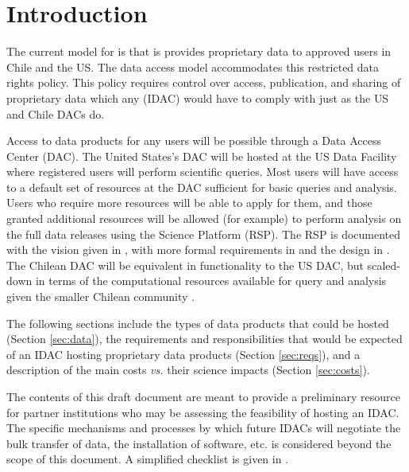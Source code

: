 \section{Introduction}\label{sec:intro}


The current model for \VRO is that is provides proprietary data to approved users in Chile and the \gls{US}. The data access model accommodates this restricted data rights policy. This policy requires control over access, publication, and sharing of proprietary data which any (\gls{IDAC}) would have to comply with just as the \gls{US} and Chile DACs do.

Access to \RO data products for any users will be possible through a Data Access \gls{Center} (\gls{DAC}). The United States's \gls{DAC} will be hosted at the \gls{US} Data Facility
where registered \RO users will perform scientific queries. Most users will have access to a default set of resources at the \gls{DAC} sufficient for basic queries and analysis. Users who require more resources will be able to apply for them, and those granted additional resources will be allowed (for example) to perform analysis on the full data releases using the \RO \gls{Science Platform} (\gls{RSP}). The \gls{RSP} is documented with the vision given in , with more formal requirements in  and the design in . The Chilean \gls{DAC} will be equivalent in functionality to the \gls{US} \gls{DAC}, but scaled-down in terms of the computational resources available for query and analysis given the smaller Chilean community .

The following sections include the types of data products that could be hosted (Section \ref{sec:data}), the requirements and responsibilities that would be expected of an \gls{IDAC} hosting \RO proprietary data products (Section \ref{sec:reqs}), and a description of the main costs {\it vs.} their science impacts (Section \ref{sec:costs}).

The contents of this draft document are meant to provide a preliminary resource for partner institutions who may be assessing the feasibility of hosting an \gls{IDAC}. The specific mechanisms and processes by which future IDACs will negotiate the bulk transfer of data, the installation of software, etc. is considered beyond the scope of this document. A simplified checklist is given in .

